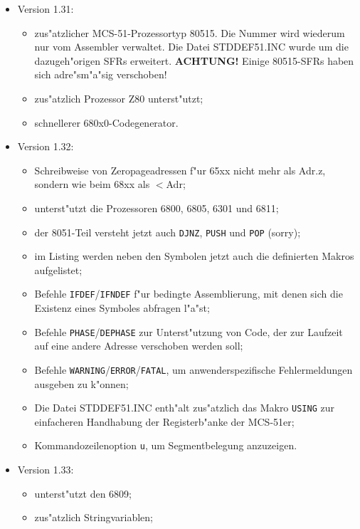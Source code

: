 \documentclass[12pt,a4paper,twoside]{report}
\newcommand{\bb}[1]{{\bf #1}}
\newcommand{\tty}[1]{{\tt #1}}
\begin{document}
\begin{itemize}
\item{Version 1.31:
      \begin{itemize}
      \item{zus"atzlicher MCS-51-Prozessortyp 80515.  Die Nummer wird
            wiederum nur vom Assembler verwaltet.  Die Datei STDDEF51.INC
            wurde um die dazugeh"origen SFRs erweitert. \bb{ACHTUNG!}
            Einige 80515-SFRs haben sich adre"sm"a"sig verschoben!}
      \item{zus"atzlich Prozessor Z80 unterst"utzt;}
      \item{schnellerer 680x0-Codegenerator.}
      \end{itemize}}
\item{Version 1.32:
      \begin{itemize}
      \item{Schreibweise von Zeropageadressen f"ur 65xx nicht mehr als
            Adr.z, sondern wie beim 68xx als $<$Adr;}
      \item{unterst"utzt die Prozessoren 6800, 6805, 6301 und 6811;}
      \item{der 8051-Teil versteht jetzt auch \tty{DJNZ}, \tty{PUSH} und
            \tty{POP} (sorry);}
      \item{im Listing werden neben den Symbolen jetzt auch die definierten
            Makros aufgelistet;}
      \item{Befehle \tty{IFDEF}/\tty{IFNDEF} f"ur bedingte Assemblierung,
            mit denen sich die Existenz eines Symboles abfragen l"a"st;}
      \item{Befehle \tty{PHASE}/\tty{DEPHASE} zur Unterst"utzung von Code, der zur
            Laufzeit auf eine andere Adresse verschoben werden soll;}
      \item{Befehle \tty{WARNING}/\tty{ERROR}/\tty{FATAL}, um anwenderspezifische
            Fehlermeldungen ausgeben zu k"onnen;}
      \item{Die Datei STDDEF51.INC enth"alt zus"atzlich das Makro \tty{USING}
            zur einfacheren Handhabung der Registerb"anke der MCS-51er;}
      \item{Kommandozeilenoption \tty{u}, um Segmentbelegung anzuzeigen.}
      \end{itemize}}
\item{Version 1.33:
      \begin{itemize}
      \item{unterst"utzt den 6809;}
      \item{zus"atzlich Stringvariablen;}

\end{itemize}}
\end{itemize}
\end{document}
